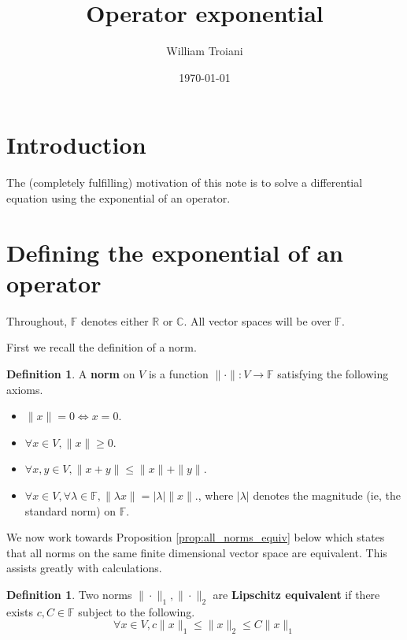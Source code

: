 \documentclass[12pt]{article}
\title{Operator exponential}
\author{William Troiani}
\date{\today}
\theoremstyle{plain}
\theoremstyle{definition}
\newtheorem{defn}[thm]{Definition} %
\newcommand{\bb}[1]{\mathbb{#1}}
\newcommand{\lto}{\longrightarrow}
\begin{document}
	\maketitle
	\tableofcontents
	
	\section{Introduction}
	The (completely fulfilling) motivation of this note is to solve a differential equation using the exponential of an operator.
	
	\section{Defining the exponential of an operator}
	Throughout, $\bb{F}$ denotes either $\bb{R}$ or $\bb{C}$. All vector spaces will be over $\bb{F}$.
	
	First we recall the definition of a norm.
	
	\begin{defn}
		A \textbf{norm} on $V$ is a function $\| \cdot \|: V \lto \bb{F}$ satisfying the following axioms.
		\begin{itemize}
			\item $\| x \| = 0 \Longleftrightarrow x = 0$.
			\item $\forall x \in V, \| x \| \geq 0$.
			\item $\forall x, y \in V, \| x + y \| \leq \| x \| + \| y \|$.
			\item $\forall x \in V, \forall \lambda \in \bb{F}, \| \lambda x \| = |\lambda| \| x \|$., where $|\lambda|$ denotes the magnitude (ie, the standard norm) on $\bb{F}$.
			\end{itemize}
		\end{defn}
	
	We now work towards Proposition \ref{prop:all_norms_equiv} below which states that all norms on the same finite dimensional vector space are equivalent. This assists greatly with calculations.
	
	\begin{defn}
		Two norms $\| \cdot \|_1, \| \cdot \|_2$ are \textbf{Lipschitz equivalent} if there exists $c,C \in \bb{F}$ subject to the following.
		\begin{equation}\label{eq:lipschitz}
			\forall x \in V, c\| x \|_1 \leq \| x \|_2 \leq C\| x \|_1
			\end{equation}
		\end{defn}
	
\end{document}
